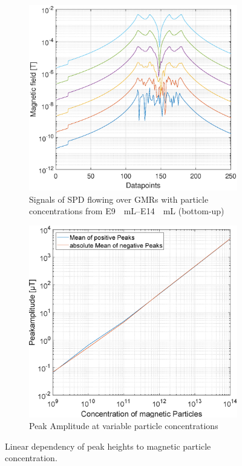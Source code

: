 	\begin{figure}[htb!]
	\begin{subfigure}[l]{0.49\linewidth} 
		\centering
		\includegraphics[clip,trim={0mm 0mm 0mm 0mm}, width=\linewidth]{Ressourcen/Results/Conc/Shape_Conc.eps}
		\caption{Signals of SPD flowing over GMRs with particle concentrations from \SIrange{E9}{E14}{\per\mL} (bottom-up)}
		\label{fig:sim:conc:ampl}
	\end{subfigure}
	\hfil
	\begin{subfigure}[r]{0.49\linewidth} 
		\centering
		\includegraphics[clip,trim={0mm 0mm 0mm 0mm}, width=.9\linewidth]{Ressourcen/Results/Conc/Shape_Conc_Ampl.eps}
		\caption{Peak Amplitude at variable particle concentrations}
		\label{fig:sim:conc:peak}
	\end{subfigure}
	\caption{Linear dependency of peak heights to magnetic particle concentration.}
	\label{fig:sim:conc}
\end{figure}
\newpage

